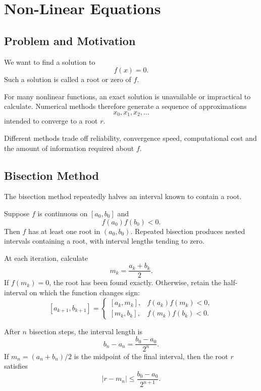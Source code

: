 \section{Non-Linear Equations}

\subsection{Problem and Motivation}

We want to find a solution to
\[
  f(x)=0.
\]
Such a solution is called a root or zero of \(f\).

For many nonlinear functions, an exact solution is unavailable or impractical to calculate. Numerical methods therefore generate a sequence of approximations
\[
  x_0,x_1,x_2,\ldots
\]
intended to converge to a root \(r\).

Different methods trade off reliability, convergence speed, computational cost and the amount of information required about \(f\).

\subsection{Bisection Method}

The bisection method repeatedly halves an interval known to contain a root.

\begin{theorem}
  Suppose \(f\) is continuous on \([a_0,b_0]\) and
  \[
    f(a_0)f(b_0)<0.
  \]
  Then \(f\) has at least one root in \((a_0,b_0)\). Repeated bisection produces nested intervals containing a root, with interval lengths tending to zero.
\end{theorem}

At each iteration, calculate
\[
  m_k=\frac{a_k+b_k}{2}.
\]
If \(f(m_k)=0\), the root has been found exactly. Otherwise, retain the half-interval on which the function changes sign:
\[
  [a_{k+1},b_{k+1}]=
  \begin{cases}
    [a_k,m_k], & f(a_k)f(m_k)<0,\\
    [m_k,b_k], & f(m_k)f(b_k)<0.
  \end{cases}
\]

\begin{theorem}
  After \(n\) bisection steps, the interval length is
  \[
    b_n-a_n=\frac{b_0-a_0}{2^n}.
  \]
  If \(m_n=(a_n+b_n)/2\) is the midpoint of the final interval, then the root \(r\) satisfies
  \[
    \boxed{
      |r-m_n|\leq\frac{b_0-a_0}{2^{n+1}}.
    }
  \]
\end{theorem}

